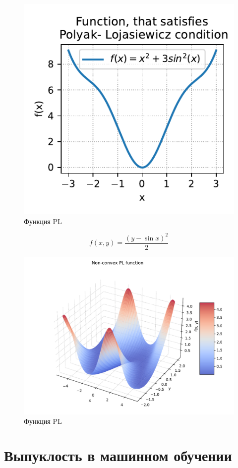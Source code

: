 \documentclass[
  russian,
  letterpaper,
  DIV=11,
  numbers=noendperiod]{scrartcl}
\begin{document}
\begin{figure}[H]

{\centering \includegraphics[width=0.45\linewidth,height=\textheight,keepaspectratio]{pl_2d.pdf}

}

\caption{Функция PL}

\end{figure}%

\[
f(x,y) = \dfrac{(y - \sin x)^2}{2}
\]

\begin{figure}[H]

{\centering \includegraphics[width=0.8\linewidth,height=\textheight,keepaspectratio]{pl_3d.pdf}

}

\caption{Функция PL}

\end{figure}%

\section{Выпуклость в машинном
обучении}\label{ux432ux44bux43fux443ux43aux43bux43eux441ux442ux44c-ux432-ux43cux430ux448ux438ux43dux43dux43eux43c-ux43eux431ux443ux447ux435ux43dux438ux438}
\end{document}
